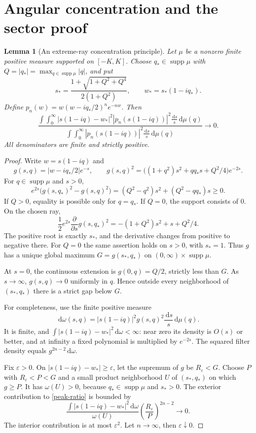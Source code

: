 \documentclass[11pt,a4paper]{article}
\newtheorem{lemma}[theorem]{Lemma}
\theoremstyle{definition}\newtheorem{definition}[theorem]{Definition}
\theoremstyle{remark}\newtheorem{remark}[theorem]{Remark}
\newcommand{\dd}{\,\mathrm d}
\DeclareMathOperator{\supp}{supp}\DeclareMathOperator{\sgn}{sgn}
\begin{document}
\section{Angular concentration and the sector proof}\label{sec:sector-proof}
\begin{lemma}[An extreme-ray concentration principle]\label{peak}
Let $\mu$ be a nonzero finite positive measure supported on $[-K,K]$. Choose $q_*\in\supp\mu$ with
$Q=|q_*|=\max_{q\in\supp\mu}|q|$, and put
\begin{equation}\label{sstar}
 s_* =\frac{1+\sqrt{1+Q^2+Q^4}}{2(1+Q^2)},
 \qquad w_*=s_*(1-iq_*).
\end{equation}
Define $p_n(w)=w(w-iq_*/2)^n e^{-nw}$. Then
\begin{equation}\label{peak-ratio}
 \frac{\displaystyle\int\!\int_0^\infty
 |s(1-iq)-w_*|^2|p_n(s(1-iq))|^2\frac{\dd s}{s}\dd\mu(q)}
 {\displaystyle\int\!\int_0^\infty
 |p_n(s(1-iq))|^2\frac{\dd s}{s}\dd\mu(q)}\longrightarrow0.
\end{equation}
All denominators are finite and strictly positive.
\end{lemma}
\begin{proof}
Write $w=s(1-iq)$ and
\[
 g(s,q)=|w-iq_*/2|e^{-s},\qquad
 g(s,q)^2=\bigl((1+q^2)s^2+q q_*s+Q^2/4\bigr)e^{-2s}.
\]
For $q\in\supp\mu$ and $s>0$,
\begin{equation}\label{angular-max}
 e^{2s}\bigl(g(s,q_*)^2-g(s,q)^2\bigr)
 =(Q^2-q^2)s^2+(Q^2-q q_*)s\ge0.
\end{equation}
If $Q>0$, equality is possible only for $q=q_*$. If $Q=0$, the support consists of $0$. On the chosen ray,
\[
 \frac12e^{2s}\frac{\partial}{\partial s}g(s,q_*)^2
 =-(1+Q^2)s^2+s+Q^2/4.
\]
The positive root is exactly $s_*$, and the derivative changes from positive to negative there. For $Q=0$ the same assertion holds on $s>0$, with $s_*=1$. Thus $g$ has a unique global maximum $G=g(s_*,q_*)$ on $(0,\infty)\times\supp\mu$.

At $s=0$, the continuous extension is $g(0,q)=Q/2$, strictly less than $G$. As $s\to\infty$, $g(s,q)\to0$ uniformly in $q$. Hence outside every neighborhood of $(s_*,q_*)$ there is a strict gap below $G$.

For completeness, use the finite positive measure
\[
 \dd\omega(s,q)=|s(1-iq)|^2g(s,q)^2\frac{\dd s}{s}\dd\mu(q).
\]
It is finite, and $\int|s(1-iq)-w_*|^2\dd\omega<\infty$: near zero its density is $O(s)$ or better, and at infinity a fixed polynomial is multiplied by $e^{-2s}$. The squared filter density equals $g^{2n-2}\dd\omega$.

Fix $\varepsilon>0$. On $|s(1-iq)-w_*|\ge\varepsilon$, let the supremum of $g$ be $R_\varepsilon<G$. Choose $P$ with $R_\varepsilon<P<G$ and a small product neighborhood $U$ of $(s_*,q_*)$ on which $g\ge P$. It has $\omega(U)>0$, because $q_*\in\supp\mu$ and $s_*>0$. The exterior contribution to \eqref{peak-ratio} is bounded by
\[
 \frac{\int|s(1-iq)-w_*|^2\dd\omega}{\omega(U)}
 \left(\frac{R_\varepsilon}{P}\right)^{2n-2}\longrightarrow0.
\]
The interior contribution is at most $\varepsilon^2$. Let $n\to\infty$, then $\varepsilon\downarrow0$.
\end{proof}
\end{document}
